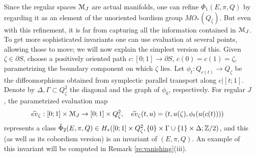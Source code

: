 \documentclass[10pt,letterpaper]{article}
\begin{document}
\begin{remark} \label{re:bordism}
Since the regular spaces $\mathcal{M}_J$ are actual manifolds, one can refine
$\Phi_1(E,\pi,Q)$ by regarding it as an element of the unoriented bordism group
$MO_*(Q_\zeta)$. But even with this refinement, it is far from capturing all
the information contained in $\mathcal{M}_J$. To get more sophisticated invariants one
can use evaluation at several points, allowing those to move; we will now
explain the simplest version of this. Given $\zeta \in \partial S$, choose a
positively oriented path $c: [0;1] \rightarrow \partial S$, $c(0) = c(1) =
\zeta$, parametrizing the boundary component on which $\zeta$ lies. Let
$\phi_t: Q_{c(t)} \rightarrow Q_\zeta$ be the diffeomorphisms obtained from
symplectic parallel transport along $c|[t;1]$. Denote by $\Delta, \Gamma
\subset Q_\zeta^2$ the diagonal and the graph of $\phi_0$, respectively. For
regular $J$, the parametrized evaluation map
\[
\widetilde{ev}_\zeta: [0;1] \times \mathcal{M}_J \rightarrow [0;1] \times Q_\zeta^2,
\quad \widetilde{ev}_\zeta(t,u) = (t,u(\zeta),\phi_t(u(c(t))))
\]
represents a class $\tilde{\Phi}_2(E,\pi,Q) \in H_*([0;1] \times Q_\zeta^2,
\{0\} \times \Gamma \cup \{1\} \times \Delta;\mathbb{Z}/2)$, and this (as well as its
cobordism version) is an invariant of $(E,\pi,Q)$. An example of this invariant
will be computed in Remark \ref{re:vanishing}(iii).
\end{remark}
\end{document}
